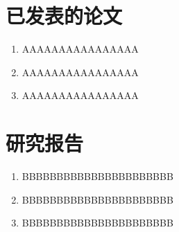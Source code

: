 \begin{publications}
  
  \section*{已发表的论文}

  \begin{enumerate}
  \item AAAAAAAAAAAAAAAA
  \item AAAAAAAAAAAAAAAA
  \item AAAAAAAAAAAAAAAA    
  \end{enumerate}

  \section*{研究报告}

  \begin{enumerate}
  \item BBBBBBBBBBBBBBBBBBBBBB
  \item BBBBBBBBBBBBBBBBBBBBBB
  \item BBBBBBBBBBBBBBBBBBBBBB    
  \end{enumerate}
  
\end{publications}
